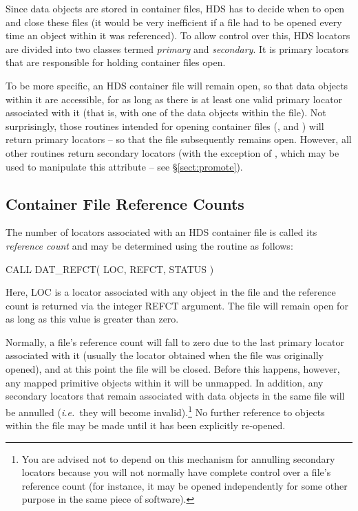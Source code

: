 \documentclass[twoside,11pt]{starlink}
\providecommand{\st}[1]{{\emph{#1}}}
\begin{document}
Since data objects are stored in container files, HDS has to decide
when to open and close these files (it would be very inefficient if a
file had to be opened every time an object within it was
referenced). To allow control over this, HDS locators are divided into
two classes termed \st{primary} and \st{secondary}. It is primary
locators that are responsible for holding container files open.

To be more specific, an HDS container file will remain open, so that
data objects within it are accessible, for as long as there is at
least one valid primary locator associated with it (that is, with one
of the data objects within the file). Not surprisingly, those routines
intended for opening container files (,
 and ) will
return primary locators -- so that the file subsequently remains
open. However, all other routines return secondary locators (with the
exception of , which may be used to
manipulate this attribute -- see \S\ref{sect:promote}).

\subsection{\label{sect:refct}Container File Reference Counts}

The number of  locators associated with
an HDS container file is called its \st{reference count} and may be
determined using the  routine as
follows:

\begin{small}
\begin{terminalv}
CALL DAT_REFCT( LOC, REFCT, STATUS )
\end{terminalv}
\end{small}

Here, LOC is a locator associated with any object in the file and the
reference count is returned via the integer REFCT argument. The file
will remain open for as long as this value is greater than zero.

Normally, a file's reference count will fall to zero due to
 the last primary locator associated
with it (usually the locator obtained when the file was originally
opened), and at this point the file will be closed. Before this
happens, however, any mapped primitive objects within it will be
unmapped. In addition, any secondary locators that remain associated
with data objects in the same file will be annulled (\st{i.e.}\ they
will become invalid).\footnote{You are advised not to depend on this
mechanism for annulling secondary locators because you will not
normally have complete control over a file's reference count (for
instance, it may be opened independently for some other purpose in the
same piece of software).} No further reference to objects within the
file may be made until it has been explicitly re-opened.
\end{document}
